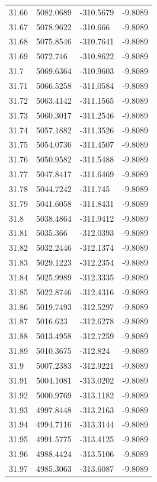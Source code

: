 \begin{table}[H]
\begin{tabular}{llll}
31.66 & 5082.0689 & -310.5679 & -9.8089 \\
31.67 & 5078.9622 & -310.666 & -9.8089 \\
31.68 & 5075.8546 & -310.7641 & -9.8089 \\
31.69 & 5072.746 & -310.8622 & -9.8089 \\
31.7 & 5069.6364 & -310.9603 & -9.8089 \\
31.71 & 5066.5258 & -311.0584 & -9.8089 \\
31.72 & 5063.4142 & -311.1565 & -9.8089 \\
31.73 & 5060.3017 & -311.2546 & -9.8089 \\
31.74 & 5057.1882 & -311.3526 & -9.8089 \\
31.75 & 5054.0736 & -311.4507 & -9.8089 \\
31.76 & 5050.9582 & -311.5488 & -9.8089 \\
31.77 & 5047.8417 & -311.6469 & -9.8089 \\
31.78 & 5044.7242 & -311.745 & -9.8089 \\
31.79 & 5041.6058 & -311.8431 & -9.8089 \\
31.8 & 5038.4864 & -311.9412 & -9.8089 \\
31.81 & 5035.366 & -312.0393 & -9.8089 \\
31.82 & 5032.2446 & -312.1374 & -9.8089 \\
31.83 & 5029.1223 & -312.2354 & -9.8089 \\
31.84 & 5025.9989 & -312.3335 & -9.8089 \\
31.85 & 5022.8746 & -312.4316 & -9.8089 \\
31.86 & 5019.7493 & -312.5297 & -9.8089 \\
31.87 & 5016.623 & -312.6278 & -9.8089 \\
31.88 & 5013.4958 & -312.7259 & -9.8089 \\
31.89 & 5010.3675 & -312.824 & -9.8089 \\
31.9 & 5007.2383 & -312.9221 & -9.8089 \\
31.91 & 5004.1081 & -313.0202 & -9.8089 \\
31.92 & 5000.9769 & -313.1182 & -9.8089 \\
31.93 & 4997.8448 & -313.2163 & -9.8089 \\
31.94 & 4994.7116 & -313.3144 & -9.8089 \\
31.95 & 4991.5775 & -313.4125 & -9.8089 \\
31.96 & 4988.4424 & -313.5106 & -9.8089 \\
31.97 & 4985.3063 & -313.6087 & -9.8089 \\

\end{tabular}
\end{table}
